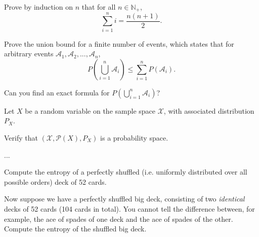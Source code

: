 \documentclass[a4paper,10pt,landscape,twocolumn]{scrartcl}
\begin{document}
\begin{exercise}

	\begin{subex}
	Prove by induction on $n$ that for all $n \in \mathbb{N}_+$,
	\[
	\sum_{i=1}^n i = \frac{n(n+1)}{2}.
	\]
	\end{subex}
	
	\begin{subex}
	Prove the union bound for a finite number of events, which states that for arbitrary events $\mathcal{A}_1, \mathcal{A}_2, ..., \mathcal{A}_n$,
	\[
	P \left( \bigcup_{i=1}^n \mathcal{A}_i \right) \leq \sum_{i=1}^n P(\mathcal{A}_i).
	\]
	\end{subex}

	\begin{subex**}
	Can you find an exact formula for $P\left( \bigcup_{i=1}^n \mathcal{A}_i \right)$?
	\end{subex**}

\end{exercise}

\begin{exercise}[]
Let $X$ be a random variable on the sample space $\mathcal{X}$, with associated distribution $P_X$.
	\begin{subex}
	Verify that $(\mathcal{X},\mathcal{P}(X),P_X)$ is a probability space.
	\end{subex}
	
	\begin{subex}
	...%
	\end{subex}
\end{exercise}

\begin{exercise}
	\begin{subex}
	Compute the entropy of a perfectly shuffled (i.e. uniformly distributed over all possible orders) deck of 52 cards.
	\end{subex}
	
	\begin{subex}
	Now suppose we have a perfectly shuffled big deck, consisting of two \emph{identical} decks of 52 cards (104 cards in total). You cannot tell the difference between, for example, the ace of spades of one deck and the ace of spades of the other. Compute the entropy of the shuffled big deck.
	\end{subex}
\end{exercise}
\end{document}
